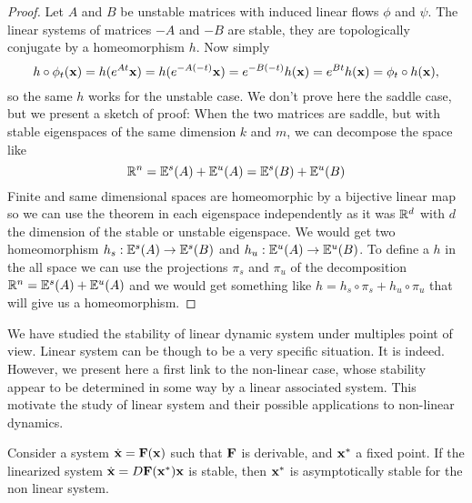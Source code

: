 \begin{proof}
    Let $A$ and $B$ be unstable matrices with induced linear flows $\phi$ and $\psi$. The linear systems of matrices $-A$ and $-B$ are stable, they are topologically conjugate by a homeomorphism $h$. Now simply $$h\circ\phi_t(\mathbf{x}) 
    = h(e^{At}\mathbf{x}) 
    = h(e^{-A(-t)}\mathbf{x}) 
    = e^{-B(-t)}h(\mathbf{x})
    = e^{Bt}h(\mathbf{x})
    = \phi_t\circ h(\mathbf{x})
    ,$$
    so the same $h$ works for the unstable case. We don't prove here the saddle case, but we present a sketch of proof:
    When the two matrices are saddle, but with stable eigenspaces of the same dimension $k$ and $m$, we can decompose the space like
    $$\mathbb{R}^n
    = \mathbb{E}^s(A)+\mathbb{E}^u(A) 
    =\mathbb{E}^s(B)+\mathbb{E}^u(B)$$
    Finite and same dimensional spaces are homeomorphic by a bijective linear map so we can use the theorem in each eigenspace independently as it was $\mathbb{R}^d$ with $d$ the dimension of the stable or unstable eigenspace. We would get two homeomorphism $h_s:\mathbb{E}^s(A)\to\mathbb{E}^s(B)$ and $h_u:\mathbb{E}^u(A)\to\mathbb{E}^u(B)$. To define a $h$ in the all space we can use the projections $\pi_s$ and $\pi_u$ of the decomposition $\mathbb{R}^n
    = \mathbb{E}^s(A)+\mathbb{E}^u(A)$  and we would get something like $h = h_s\circ\pi_s + h_u\circ\pi_u$ that will give us a homeomorphism.
\end{proof}
We have studied the stability of linear dynamic system under multiples point of view. Linear system can be though to be a very specific situation. It is indeed. However, we present here a first link to the non-linear case, whose stability appear to be determined in some way by a linear associated system. This motivate the study of linear system and their possible applications to non-linear dynamics.
\begin{theoreme}[Linearization]
    Consider a system $\dot{\mathbf{x}}=\mathbf{F}(\mathbf{x})$ such that $\mathbf{F}$ is derivable, and $\mathbf{x}^*$ a fixed point. If the linearized system $\dot{\mathbf{x}}=D\mathbf{F}(\mathbf{x}^*)\mathbf{x}$ is stable, then $\mathbf{x}^*$ is asymptotically stable for the non linear system.
\end{theoreme}
